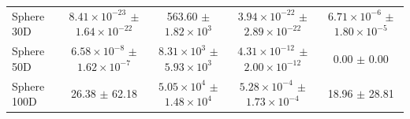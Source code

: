 \begin{table}[htbp]
{\begin{tabular}{lcccc}
Sphere 30D & \textbf{$8.41 \times 10^{-23}$ $\pm$ $1.64 \times 10^{-22}$} & 563.60 $\pm$ $1.82 \times 10^{3}$ & $3.94 \times 10^{-22}$ $\pm$ $2.89 \times 10^{-22}$ & $6.71 \times 10^{-6}$ $\pm$ $1.80 \times 10^{-5}$ \\
Sphere 50D & $6.58 \times 10^{-8}$ $\pm$ $1.62 \times 10^{-7}$ & $8.31 \times 10^{3}$ $\pm$ $5.93 \times 10^{3}$ & \textbf{$4.31 \times 10^{-12}$ $\pm$ $2.00 \times 10^{-12}$} & 0.00 $\pm$ 0.00 \\
Sphere 100D & 26.38 $\pm$ 62.18 & $5.05 \times 10^{4}$ $\pm$ $1.48 \times 10^{4}$ & \textbf{$5.28 \times 10^{-4}$ $\pm$ $1.73 \times 10^{-4}$} & 18.96 $\pm$ 28.81 \\
\hline
\end{tabular}
}
\end{table}

